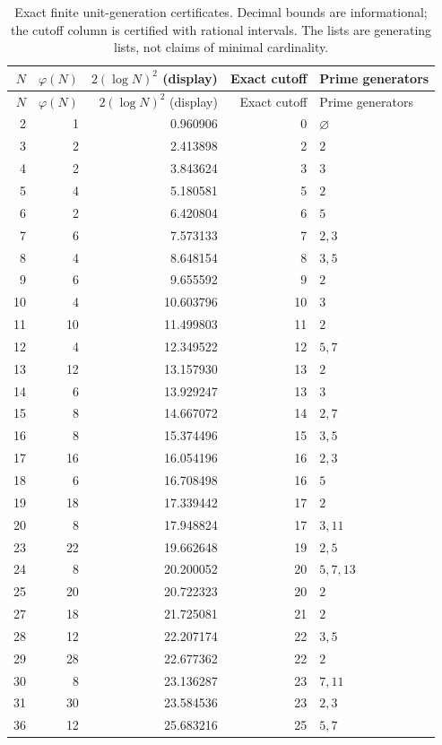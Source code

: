 \documentclass[11pt,a4paper]{article}
\begin{document}
\begin{longtable}{rrrrl}
\caption{Exact finite unit-generation certificates. Decimal bounds are informational; the cutoff column is certified with rational intervals. The lists are generating lists, not claims of minimal cardinality.}\\
\hline
$N$&$\varphi(N)$&$2(\log N)^2$ (display)&Exact cutoff&Prime generators\\\hline
\endfirsthead
\hline
$N$&$\varphi(N)$&$2(\log N)^2$ (display)&Exact cutoff&Prime generators\\\hline
\endhead
2 & 1 & 0.960906 & 0 & $\varnothing$ \\
3 & 2 & 2.413898 & 2 & $2$ \\
4 & 2 & 3.843624 & 3 & $3$ \\
5 & 4 & 5.180581 & 5 & $2$ \\
6 & 2 & 6.420804 & 6 & $5$ \\
7 & 6 & 7.573133 & 7 & $2,3$ \\
8 & 4 & 8.648154 & 8 & $3,5$ \\
9 & 6 & 9.655592 & 9 & $2$ \\
10 & 4 & 10.603796 & 10 & $3$ \\
11 & 10 & 11.499803 & 11 & $2$ \\
12 & 4 & 12.349522 & 12 & $5,7$ \\
13 & 12 & 13.157930 & 13 & $2$ \\
14 & 6 & 13.929247 & 13 & $3$ \\
15 & 8 & 14.667072 & 14 & $2,7$ \\
16 & 8 & 15.374496 & 15 & $3,5$ \\
17 & 16 & 16.054196 & 16 & $2,3$ \\
18 & 6 & 16.708498 & 16 & $5$ \\
19 & 18 & 17.339442 & 17 & $2$ \\
20 & 8 & 17.948824 & 17 & $3,11$ \\
23 & 22 & 19.662648 & 19 & $2,5$ \\
24 & 8 & 20.200052 & 20 & $5,7,13$ \\
25 & 20 & 20.722323 & 20 & $2$ \\
27 & 18 & 21.725081 & 21 & $2$ \\
28 & 12 & 22.207174 & 22 & $3,5$ \\
29 & 28 & 22.677362 & 22 & $2$ \\
30 & 8 & 23.136287 & 23 & $7,11$ \\
31 & 30 & 23.584536 & 23 & $2,3$ \\
36 & 12 & 25.683216 & 25 & $5,7$ \\

\end{longtable}
\end{document}
